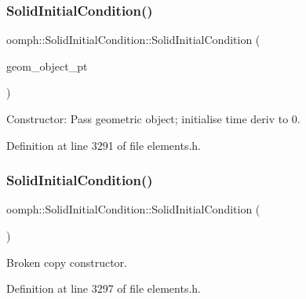 \subsubsection{\texorpdfstring{Solid\+Initial\+Condition()}{SolidInitialCondition()}\hspace{0.1cm}{\footnotesize\ttfamily [1/2]}}
{\footnotesize\ttfamily oomph\+::\+Solid\+Initial\+Condition\+::\+Solid\+Initial\+Condition (\begin{DoxyParamCaption}\item[{\hyperlink{classoomph_1_1GeomObject}{Geom\+Object} $\ast$}]{geom\+\_\+object\+\_\+pt }\end{DoxyParamCaption})\hspace{0.3cm}{\ttfamily [inline]}}



Constructor\+: Pass geometric object; initialise time deriv to 0. 



Definition at line 3291 of file elements.\+h.

\mbox{\label{classoomph_1_1SolidInitialCondition_aac6769fc4973ea1862c50df8a4ca6536}} 
\subsubsection{\texorpdfstring{Solid\+Initial\+Condition()}{SolidInitialCondition()}\hspace{0.1cm}{\footnotesize\ttfamily [2/2]}}
{\footnotesize\ttfamily oomph\+::\+Solid\+Initial\+Condition\+::\+Solid\+Initial\+Condition (\begin{DoxyParamCaption}\item[{const \hyperlink{classoomph_1_1SolidInitialCondition}{Solid\+Initial\+Condition} \&}]{ }\end{DoxyParamCaption})\hspace{0.3cm}{\ttfamily [inline]}}



Broken copy constructor. 



Definition at line 3297 of file elements.\+h.




